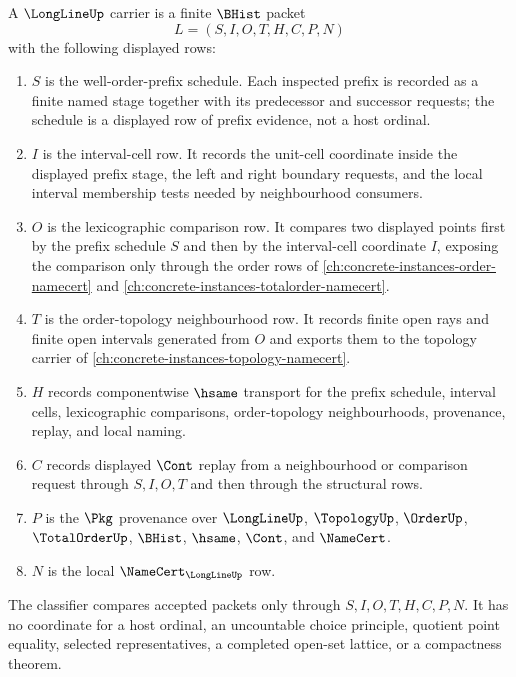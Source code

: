 \begin{definition}
\label{def:long-line-carrier}
A $\LongLineUp$ carrier is a finite $\BHist$ packet
$$
L=(S,I,O,T,H,C,P,N)
$$
with the following displayed rows:
\begin{enumerate}
\item $S$ is the well-order-prefix schedule. Each inspected prefix is recorded as a finite named stage together with its predecessor and successor requests; the schedule is a displayed row of prefix evidence, not a host ordinal.
\item $I$ is the interval-cell row. It records the unit-cell coordinate inside the displayed prefix stage, the left and right boundary requests, and the local interval membership tests needed by neighbourhood consumers.
\item $O$ is the lexicographic comparison row. It compares two displayed points first by the prefix schedule $S$ and then by the interval-cell coordinate $I$, exposing the comparison only through the order rows of \autoref{ch:concrete-instances-order-namecert} and \autoref{ch:concrete-instances-totalorder-namecert}.
\item $T$ is the order-topology neighbourhood row. It records finite open rays and finite open intervals generated from $O$ and exports them to the topology carrier of \autoref{ch:concrete-instances-topology-namecert}.
\item $H$ records componentwise $\hsame$ transport for the prefix schedule, interval cells, lexicographic comparisons, order-topology neighbourhoods, provenance, replay, and local naming.
\item $C$ records displayed $\Cont$ replay from a neighbourhood or comparison request through $S,I,O,T$ and then through the structural rows.
\item $P$ is the $\Pkg$ provenance over $\LongLineUp$, $\TopologyUp$, $\OrderUp$, $\TotalOrderUp$, $\BHist$, $\hsame$, $\Cont$, and $\NameCert$.
\item $N$ is the local $\NameCert_{\LongLineUp}$ row.
\end{enumerate}
The classifier compares accepted packets only through $S,I,O,T,H,C,P,N$. It has no coordinate for a host ordinal, an uncountable choice principle, quotient point equality, selected representatives, a completed open-set lattice, or a compactness theorem.
\end{definition}

